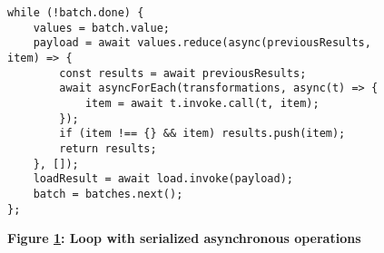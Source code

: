 \begin{figure}[H]
  \centering
  \begin{mdframed}[rightline=true,leftline=true]
    \begin{verbatim}
while (!batch.done) {
    values = batch.value;
    payload = await values.reduce(async(previousResults, item) => {
        const results = await previousResults;
        await asyncForEach(transformations, async(t) => {
            item = await t.invoke.call(t, item);
        });
        if (item !== {} && item) results.push(item);
        return results;
    }, []);
    loadResult = await load.invoke(payload);
    batch = batches.next();
};
    \end{verbatim}
  \end{mdframed}
  \caption[Serializing asynchronous operations]{\textbf{Figure \ref{fig-engine}: Loop with serialized asynchronous operations}}
  \label{fig-engine}
\end{figure}